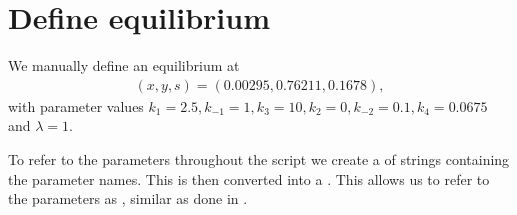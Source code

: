 \documentclass[letterpaper,10pt,english]{jupyterBook}
\begin{document}
\begin{sphinxVerbatim}[commandchars=\\\{\}]
\end{sphinxVerbatim}


\section{Define equilibrium}
\label{\detokenize{CO-oxidation:define-equilibrium}}
\sphinxAtStartPar
We manually define an equilibrium at
\begin{equation}\label{equation:CO-oxidation:eq:COoxidation:equilibrium}
\begin{split}(x,y,s) = (0.00295, 0.76211, 0.1678),\end{split}
\end{equation}
\sphinxAtStartPar
with parameter values \(k_1=2.5, k_{-1} = 1, k_3 = 10, k_2 = 0, k_{-2} = 0.1, k_4 = 0.0675\) and \(\lambda = 1\).

\sphinxAtStartPar
To refer to the parameters throughout the script we create a  of
strings containing the parameter names. This is then converted into a
. This allows us to refer to the parameters as ,
similar as done in .
\end{document}
